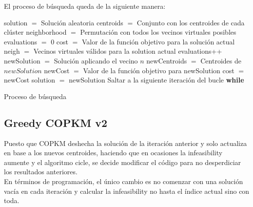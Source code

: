 El proceso de búsqueda queda de la siguiente manera: \\

\begin{algorithm}[H]
    \SetAlgoLined
        solution $=$ Solución aleatoria \;
        centroids $=$ Conjunto con los centroides de cada clúster \;
        neighborhood $=$ Permutación con todos los vecinos virtuales posibles \;
        evaluations $=$ 0 \;
        cost $=$ Valor de la función objetivo para la solución actual \;
         {
            neigh $=$ Vecinos virtuales válidos para la solution actual \;
             {
                evaluations++ \;
                newSolution $=$ Solución aplicando el vecino $n$ \;
                newCentroids $=$ Centroides de $newSolution$ \;
                newCost $=$ Valor de la función objetivo para newSolution \;
                 {
                    cost $=$ newCost \;
                    solution $=$ newSolution \;
                    Saltar a la siguiente iteración del bucle \textbf{while} \;
                }
            }
        }
    \caption{Proceso de búsqueda}
\end{algorithm}

\newpage


\subsection{Greedy COPKM v2}

Puesto que COPKM deshecha la solución de la iteración anterior y solo actualiza en base a los nuevos centroides, haciendo que en ocasiones la infeasibility aumente y el algoritmo cicle, se decide modificar el código para no desperdiciar los resultados anteriores. \\

En términos de programación, el único cambio es no comenzar con una solución vacía en cada iteración y calcular la infeasibility no hasta el índice actual sino con toda. \\

